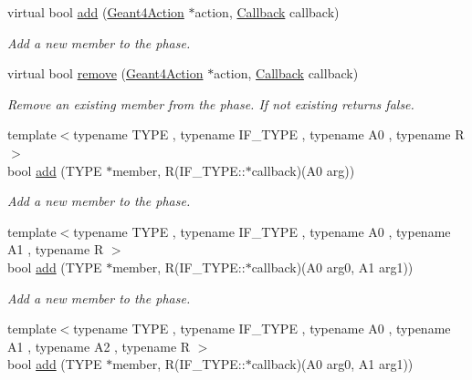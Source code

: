 \begin{DoxyCompactItemize}
virtual bool \hyperlink{class_d_d4hep_1_1_simulation_1_1_geant4_action_phase_a61f8e3266a3e0f059539479fd335bb08}{add} (\hyperlink{class_d_d4hep_1_1_simulation_1_1_geant4_action}{Geant4Action} $\ast$action, \hyperlink{class_d_d4hep_1_1_callback}{Callback} callback)
\begin{DoxyCompactList}\small\item\em Add a new member to the phase. \item\end{DoxyCompactList}\item 
virtual bool \hyperlink{class_d_d4hep_1_1_simulation_1_1_geant4_action_phase_aac2407103c62385824359ff8fa680f48}{remove} (\hyperlink{class_d_d4hep_1_1_simulation_1_1_geant4_action}{Geant4Action} $\ast$action, \hyperlink{class_d_d4hep_1_1_callback}{Callback} callback)
\begin{DoxyCompactList}\small\item\em Remove an existing member from the phase. If not existing returns false. \item\end{DoxyCompactList}\item 
{\footnotesize template$<$typename TYPE , typename IF\_\-TYPE , typename A0 , typename R $>$ }\\bool \hyperlink{class_d_d4hep_1_1_simulation_1_1_geant4_action_phase_a3d654d4b6017d6bfa74c4651b9f70bfd}{add} (TYPE $\ast$member, R(IF\_\-TYPE::$\ast$callback)(A0 arg))
\begin{DoxyCompactList}\small\item\em Add a new member to the phase. \item\end{DoxyCompactList}\item 
{\footnotesize template$<$typename TYPE , typename IF\_\-TYPE , typename A0 , typename A1 , typename R $>$ }\\bool \hyperlink{class_d_d4hep_1_1_simulation_1_1_geant4_action_phase_ad63f4a395da9d021994d58bd8b1ce015}{add} (TYPE $\ast$member, R(IF\_\-TYPE::$\ast$callback)(A0 arg0, A1 arg1))
\begin{DoxyCompactList}\small\item\em Add a new member to the phase. \item\end{DoxyCompactList}\item 
{\footnotesize template$<$typename TYPE , typename IF\_\-TYPE , typename A0 , typename A1 , typename A2 , typename R $>$ }\\bool \hyperlink{class_d_d4hep_1_1_simulation_1_1_geant4_action_phase_ad63f4a395da9d021994d58bd8b1ce015}{add} (TYPE $\ast$member, R(IF\_\-TYPE::$\ast$callback)(A0 arg0, A1 arg1))

\end{DoxyCompactItemize}
